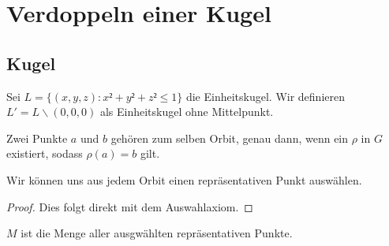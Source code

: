 \chapter{Verdoppeln einer Kugel}

\section{Kugel}
\begin{definition}\label{def:kugel_ohne_mittelpunkt}
Sei $L=\{(x,y,z):x²+y²+z²\leq1\}$ die Einheitskugel. Wir definieren $L'=L\backslash {(0,0,0)}$ als Einheitskugel ohne Mittelpunkt.
\leanok
\end{definition}

\begin{definition}[Orbit] \label{def:orbit} 
Zwei Punkte $a$ und $b$ gehören zum selben Orbit, genau dann, wenn ein $\rho$ in $G$ existiert, sodass $\rho(a)=b$ gilt.
\leanok {}
\end{definition}



\begin{lemma} \label{theorem:rep_punkte}
Wir können uns aus jedem Orbit einen repräsentativen Punkt auswählen.
\end{lemma}
\begin{proof} 
Dies folgt direkt mit dem Auswahlaxiom.
\end{proof}

\begin{definition} \label{def:menge_rep_punkte} 
$M$ ist die Menge aller ausgwählten repräsentativen Punkte.
\end{definition} 

